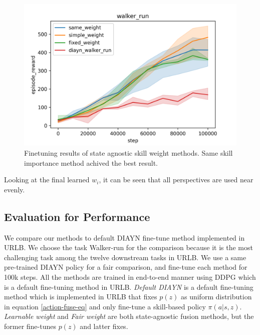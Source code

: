 \begin{figure}[ht]
    \vskip 0.2in
    \begin{center}
    \centerline{\includegraphics[width=\columnwidth]{Figures/multiple_seed_state_agnostic_methods.png}}
    \caption{Finetuning results of state agnostic skill weight methods. Same skill importance method achived the best result.}
    \label{state agnostic results}
    \end{center}
    \vskip -0.2in
\end{figure}
Looking at the final learned ${w_i}$, it can be seen that all perspectives are used near evenly.


\subsection{Evaluation for Performance}

We compare our methods to default DIAYN fine-tune method implemented in URLB.
We choose the task Walker-run for the comparison because it is the most challenging task among the twelve downstream tasks in URLB.
We use a same pre-trained DIAYN policy for a fair comparison, and fine-tune each method for 100k steps.
All the methods are trained in end-to-end manner using DDPG which is a default fine-tuning method in URLB.
\emph{Default DIAYN} is a default fine-tuning method which is implemented in URLB that fixes $p(z)$ as uniform distribution in equation \ref{action-fuse-eq} and only fine-tune a skill-based policy $\pi(a|s,z)$.
\emph{Learnable weight} and \emph{Fair weight} are both state-agnostic fusion methods, but the former fine-tunes $p(z)$ and latter fixes.

